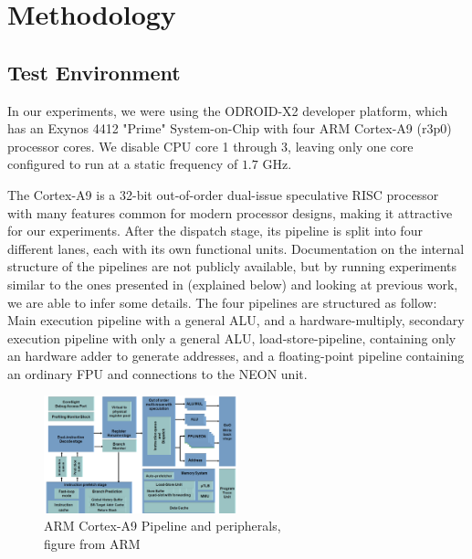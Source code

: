 \section{Methodology}


\subsection{Test Environment}
In our experiments, we were using the ODROID-X2 \cite{odroid-x2} developer
platform, which has an Exynos 4412 "Prime" System-on-Chip with four ARM
Cortex-A9 (r3p0) processor cores. We disable CPU core 1 through 3, leaving only
one core configured to run at a static frequency of $1.7$ GHz.

The Cortex-A9 is a 32-bit out-of-order dual-issue speculative RISC processor
with many features common for modern processor designs\cite{patterson}\cite{hennessy},
making it attractive for our experiments. After the dispatch stage, its pipeline
is split into four different lanes, each with its own functional units.
Documentation on the internal structure of the pipelines are not publicly
available, but by running experiments similar to the ones presented in
\cite{paper} (explained below) and looking at previous
work\cite{armtech}\cite{7cpu}\cite{lotofdocs}, we are able to infer some
details.  The four pipelines are structured as follow: Main execution pipeline
with a general ALU, and a hardware-multiply, secondary execution pipeline with
only a general ALU, load-store-pipeline, containing only an hardware adder to
generate addresses, and a floating-point pipeline containing an ordinary FPU and
connections to the NEON unit.

\begin{figure}
    \begin{center}
        \includegraphics[width=0.5\textwidth]{figures/A9-Pipeline-hres}
        \caption{ARM Cortex-A9 Pipeline and peripherals,\\
        figure from ARM\cite{pipeline}}
    \end{center}
    \label{fig:pipeline}
\end{figure}

